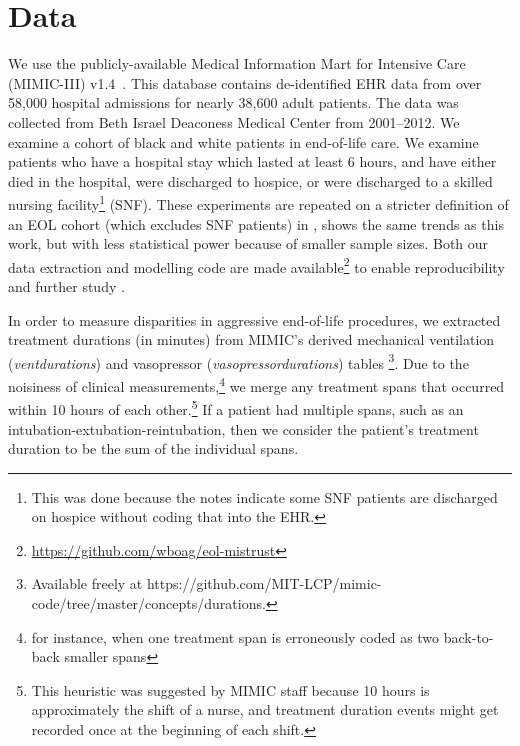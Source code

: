 \documentclass{article}
\begin{document}
\section{Data}
\label{sec:data}

We use the publicly-available Medical Information Mart for Intensive Care (MIMIC-III) v1.4~\citep{johnson2016mimiciii}. This database contains de-identified EHR data from over 58,000 hospital admissions for nearly 38,600 adult patients. The data was collected from Beth Israel Deaconess Medical Center from 2001--2012. We examine a cohort of black and white patients in end-of-life care.
We examine patients who have a hospital stay which lasted at least 6 hours, and have either died in the hospital, were discharged to hospice, or were discharged to a skilled nursing facility\footnote{This was done because the notes indicate some SNF patients are discharged on hospice without coding that into the EHR.} (SNF). These experiments are repeated on a stricter definition of an EOL cohort (which excludes SNF patients) in \cite{boag-eol-mistrust}, shows the same trends as this work, but with less statistical power because of smaller sample sizes.
Both our data extraction and modelling code are made available\footnote{\url{https://github.com/wboag/eol-mistrust}} to enable reproducibility and further study \citep{johnson:mlhc17-reproduce}.

In order to measure disparities in aggressive end-of-life procedures, we extracted treatment durations (in minutes) from MIMIC's derived mechanical ventilation (\textit{ventdurations}) and vasopressor (\textit{vasopressordurations}) tables \footnote{Available freely at https://github.com/MIT-LCP/mimic-code/tree/master/concepts/durations.}. Due to the noisiness of clinical measurements,\footnote{for instance, when one treatment span is erroneously coded as two back-to-back smaller spans} we merge any treatment spans that occurred within 10 hours of each other.\footnote{This heuristic was suggested by MIMIC staff because 10 hours is approximately the shift of a nurse, and treatment duration events might get recorded once at the beginning of each shift.} If a patient had multiple spans, such as an intubation-extubation-reintubation, then we consider the patient's treatment duration to be the sum of the individual spans.
\end{document}
